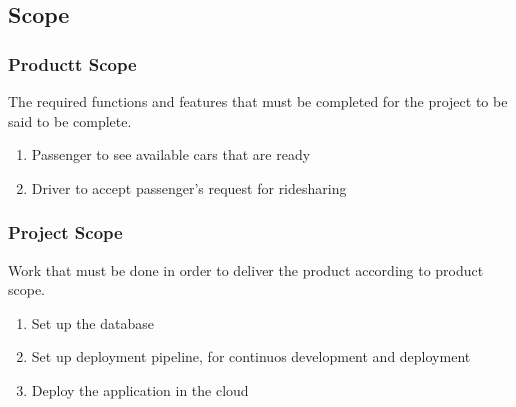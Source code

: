 \subsection{Scope}

\subsubsection{Productt Scope}

The required functions and features that must be completed for the project to be said to be complete.

\begin{enumerate}
    \item Passenger to see available cars that are ready
    \item Driver to accept passenger's request for ridesharing
\end{enumerate}

\subsubsection{Project Scope}

Work that must be done in order to deliver the product according to product scope.

\begin{enumerate}
    \item Set up the database
    \item Set up deployment pipeline, for continuos development and deployment
    \item Deploy the application in the cloud
\end{enumerate}